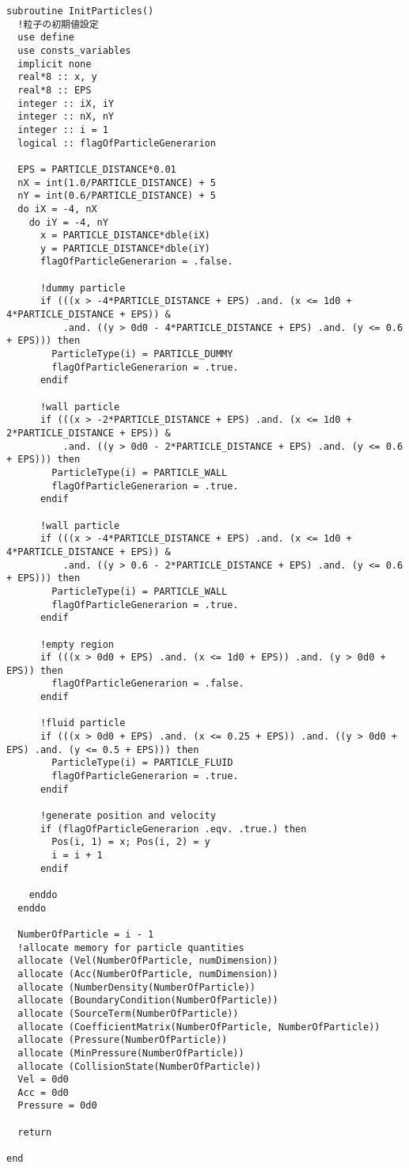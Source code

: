 \begin{lstlisting}[caption=粒子初期化ルーチン]
subroutine InitParticles()
  !粒子の初期値設定
  use define
  use consts_variables
  implicit none
  real*8 :: x, y
  real*8 :: EPS
  integer :: iX, iY
  integer :: nX, nY
  integer :: i = 1
  logical :: flagOfParticleGenerarion

  EPS = PARTICLE_DISTANCE*0.01
  nX = int(1.0/PARTICLE_DISTANCE) + 5
  nY = int(0.6/PARTICLE_DISTANCE) + 5
  do iX = -4, nX
    do iY = -4, nY
      x = PARTICLE_DISTANCE*dble(iX)
      y = PARTICLE_DISTANCE*dble(iY)
      flagOfParticleGenerarion = .false.

      !dummy particle
      if (((x > -4*PARTICLE_DISTANCE + EPS) .and. (x <= 1d0 + 4*PARTICLE_DISTANCE + EPS)) &
          .and. ((y > 0d0 - 4*PARTICLE_DISTANCE + EPS) .and. (y <= 0.6 + EPS))) then
        ParticleType(i) = PARTICLE_DUMMY
        flagOfParticleGenerarion = .true.
      endif

      !wall particle
      if (((x > -2*PARTICLE_DISTANCE + EPS) .and. (x <= 1d0 + 2*PARTICLE_DISTANCE + EPS)) &
          .and. ((y > 0d0 - 2*PARTICLE_DISTANCE + EPS) .and. (y <= 0.6 + EPS))) then
        ParticleType(i) = PARTICLE_WALL
        flagOfParticleGenerarion = .true.
      endif

      !wall particle
      if (((x > -4*PARTICLE_DISTANCE + EPS) .and. (x <= 1d0 + 4*PARTICLE_DISTANCE + EPS)) &
          .and. ((y > 0.6 - 2*PARTICLE_DISTANCE + EPS) .and. (y <= 0.6 + EPS))) then
        ParticleType(i) = PARTICLE_WALL
        flagOfParticleGenerarion = .true.
      endif

      !empty region
      if (((x > 0d0 + EPS) .and. (x <= 1d0 + EPS)) .and. (y > 0d0 + EPS)) then
        flagOfParticleGenerarion = .false.
      endif

      !fluid particle
      if (((x > 0d0 + EPS) .and. (x <= 0.25 + EPS)) .and. ((y > 0d0 + EPS) .and. (y <= 0.5 + EPS))) then
        ParticleType(i) = PARTICLE_FLUID
        flagOfParticleGenerarion = .true.
      endif

      !generate position and velocity
      if (flagOfParticleGenerarion .eqv. .true.) then
        Pos(i, 1) = x; Pos(i, 2) = y
        i = i + 1
      endif

    enddo
  enddo

  NumberOfParticle = i - 1
  !allocate memory for particle quantities
  allocate (Vel(NumberOfParticle, numDimension))
  allocate (Acc(NumberOfParticle, numDimension))
  allocate (NumberDensity(NumberOfParticle))
  allocate (BoundaryCondition(NumberOfParticle))
  allocate (SourceTerm(NumberOfParticle))
  allocate (CoefficientMatrix(NumberOfParticle, NumberOfParticle))
  allocate (Pressure(NumberOfParticle))
  allocate (MinPressure(NumberOfParticle))
  allocate (CollisionState(NumberOfParticle))
  Vel = 0d0
  Acc = 0d0
  Pressure = 0d0

  return

end
\end{lstlisting}